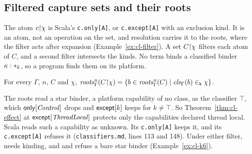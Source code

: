 \subsection{Filtered capture sets and their roots}\label{sec:cl-filter}

The atom $c{\restriction}\chi$ is Scala's \lstinline{c.only[A]}, or \lstinline{c.except[A]} with an exclusion kind. It is an atom, not an operation on the set, and resolution carries it to the roots, where the filter acts after expansion (Example~\ref{ex:cl-filter}). A set $C{\restriction}\chi$ filters each atom of $C$, and a second filter intersects the kinds. No term binds a classified binder $\kappa : \ast_{k}$, so a program finds them on its platform.

\begin{lemma}\label{lem:cl-roots-proj}
For every $\Gamma$, $n$, $C$ and $\chi$, $\mathit{roots}^{n}_{\Gamma}(C{\restriction}\chi) = \{b \in \mathit{roots}^{n}_{\Gamma}(C) \mid \mathit{cls}_{\Gamma}(b) \mathrel{\in_{\mathsf{k}}} \chi\}$.
\end{lemma}

The roots read a star binder, a platform capability of no class, as the classifier $\top$, which $\mathsf{only}[\mathit{Control}]$ drops and $\mathsf{except}[k]$ keeps for $k \neq \top$. So Theorem~\ref{thm:cl-effect} at $\mathsf{except}[\mathit{ThreadLocal}]$ protects only the capabilities declared thread local. Scala reads such a capability as unknown. Its \lstinline{c.only[A]} keeps it, and its \lstinline{c.except[A]} refuses it (\texttt{classifiers.md}, lines 113 and 148). Under either filter,  needs kinding, and  and  refuse a bare star binder (Example~\ref{ex:cl-k6}).

